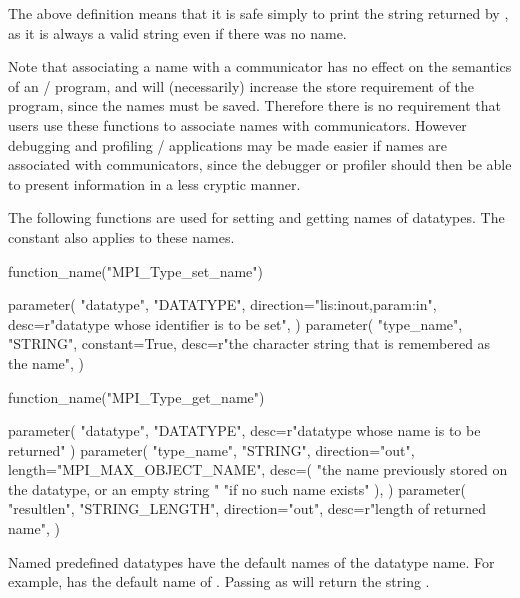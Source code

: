 \begin{users}
The above definition means that it is safe simply to print the string
returned by , as it is always a valid
string even if there was no name.

Note that associating a name with a communicator has no effect on the
semantics of an \MPI/ program, and will (necessarily)
increase the store requirement of the program, since the names must be
saved. Therefore there is no requirement that users use these functions to
associate names with
communicators. However debugging and profiling \MPI/ applications may be made
easier if names are associated with communicators,
since the debugger or profiler should then be able to present
information in a less cryptic manner.
\end{users}

The following functions are used for setting and getting names of datatypes.
The constant  also applies to these names.

\begin{mpi-binding}
    function_name("MPI_Type_set_name")
    
    parameter(
        "datatype",
        "DATATYPE",
        direction="lis:inout,param:in",
        desc=r"datatype whose identifier is to be set",
    )
    parameter(
        "type_name",
        "STRING",
        constant=True,
        desc=r"the character string that is remembered as the name",
    )
\end{mpi-binding}

\begin{mpi-binding}
    function_name("MPI_Type_get_name")
    
    parameter(
        "datatype", "DATATYPE", desc=r"datatype whose name is to be returned"
    )
    parameter(
        "type_name",
        "STRING",
        direction="out",
        length="MPI_MAX_OBJECT_NAME",
        desc=(
            "the name previously stored on the datatype, or an empty string "
            "if no such name exists"
        ),
    )
    parameter(
        "resultlen",
        "STRING_LENGTH",
        direction="out",
        desc=r"length of returned name",
    )
\end{mpi-binding}

Named predefined datatypes have the default names of the datatype name.
For example,  has the default name of
.
Passing  as  will return the string
.

